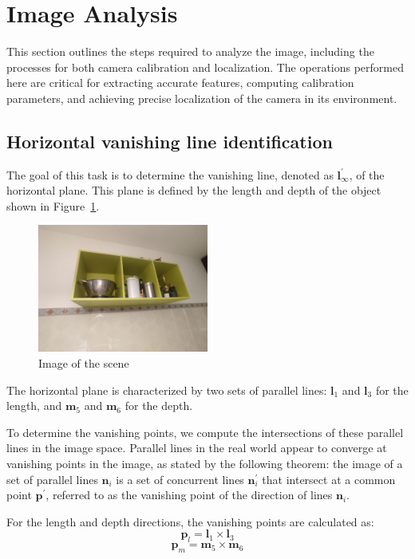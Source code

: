 \documentclass{Academic}
\begin{document}
\section{Image Analysis}
This section outlines the steps required to analyze the image, including the processes for both camera calibration and localization. 
The operations performed here are critical for extracting accurate features, computing calibration parameters, and achieving precise localization of the camera in its environment.
\subsection{Horizontal vanishing line identification}
The goal of this task is to determine the vanishing line, denoted as $\mathbf{l}^\prime_{\infty}$, of the horizontal plane. 
This plane is defined by the length and depth of the object shown in Figure~\ref{fig:scene}.

\begin{figure}[!htb]%
    \centering
    \includegraphics[width=0.5\textwidth]{images/scene.jpg}
    \caption{Image of the scene}
    \label{fig:scene}
\end{figure}

\noindent The horizontal plane is characterized by two sets of parallel lines: $\mathbf{l}_1$ and $\mathbf{l}_3$ for the length, and $\mathbf{m}_5$ and $\mathbf{m}_6$ for the depth.

To determine the vanishing points, we compute the intersections of these parallel lines in the image space. 
Parallel lines in the real world appear to converge at vanishing points in the image, as stated by the following theorem: the image of a set of parallel lines $\mathbf{n}_i$ is a set of concurrent lines $\mathbf{n}^\prime_i$ that intersect at a common point $\mathbf{p}^\prime$, referred to as the vanishing point of the direction of lines $\mathbf{n}_i$.

For the length and depth directions, the vanishing points are calculated as:
\begin{equation}\mathbf{p}_l=\mathbf{l}_1 \times \mathbf{l}_3\end{equation}
\begin{equation}\mathbf{p}_m=\mathbf{m}_5 \times \mathbf{m}_6\end{equation}
\end{document}
